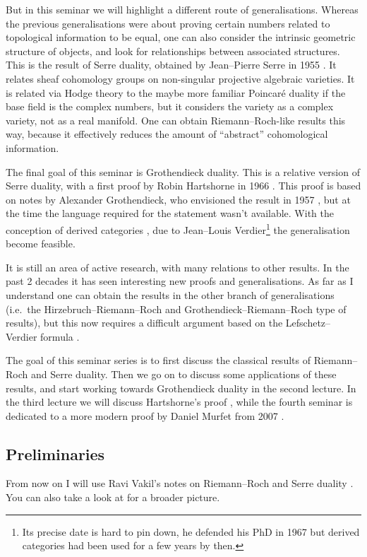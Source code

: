 \documentclass[10pt,a4paper]{article}
\begin{document}
But in this seminar we will highlight a different route of generalisations. Whereas the previous generalisations were about proving certain numbers related to topological information to be equal, one can also consider the intrinsic geometric structure of objects, and look for relationships between associated structures. This is the result of Serre duality, obtained by Jean--Pierre Serre in 1955 \cite{serre-faisceaux-algebriques-coherents}. It relates sheaf cohomology groups on non-singular projective algebraic varieties. It is related via Hodge theory to the maybe more familiar Poincar\'e duality if the base field is the complex numbers, but it considers the variety as a complex variety, not as a real manifold. One can obtain Riemann--Roch-like results this way, because it effectively reduces the amount of ``abstract'' cohomological information.

The final goal of this seminar is Grothendieck duality. This is a relative version of Serre duality, with a first proof by Robin Hartshorne in 1966 \cite{hartshorne-residues-and-duality}. This proof is based on notes by Alexander Grothendieck, who envisioned the result in 1957 \cite{grothendieck-theoremes-de-dualite}, but at the time the language required for the statement wasn't available. With the conception of derived categories \cite{verdier-phd}, due to Jean--Louis Verdier\footnote{Its precise date is hard to pin down, he defended his PhD in 1967 but derived categories had been used for a few years by then.} the generalisation become feasible.

It is still an area of active research, with many relations to other results. In the past 2 decades it has seen interesting new proofs and generalisations. As far as I understand one can obtain the results in the other branch of generalisations (i.e.\ the Hirzebruch--Riemann--Roch and Grothendieck--Riemann--Roch type of results), but this now requires a difficult argument based on the Lefschetz--Verdier formula \cite[expos\'e III]{sga5}.

The goal of this seminar series is to first discuss the classical results of Riemann--Roch and Serre duality. Then we go on to discuss some applications of these results, and start working towards Grothendieck duality in the second lecture. In the third lecture we will discuss Hartshorne's proof \cite{hartshorne-residues-and-duality}, while the fourth seminar is dedicated to a more modern proof by Daniel Murfet from 2007 \cite{murfet-phd}.


\subsection{Preliminaries}
\label{subsection:preliminaries}
From now on I will use Ravi Vakil's notes on Riemann--Roch and Serre duality \cite{vakil-proof-riemann-roch}. You can also take a look at \cite{vakil-math216} for a broader picture.
\end{document}
